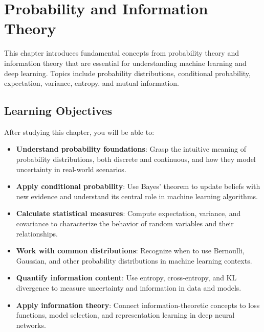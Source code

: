 
\chapter{Probability and Information Theory}
\label{chap:probability}

This chapter introduces fundamental concepts from probability theory and information theory that are essential for understanding machine learning and deep learning. Topics include probability distributions, conditional probability, expectation, variance, entropy, and mutual information.

\section*{Learning Objectives}

After studying this chapter, you will be able to:

\begin{itemize}
    \item \textbf{Understand probability foundations}: Grasp the intuitive meaning of probability distributions, both discrete and continuous, and how they model uncertainty in real-world scenarios.
    
    \item \textbf{Apply conditional probability}: Use Bayes' theorem to update beliefs with new evidence and understand its central role in machine learning algorithms.
    
    \item \textbf{Calculate statistical measures}: Compute expectation, variance, and covariance to characterize the behavior of random variables and their relationships.
    
    \item \textbf{Work with common distributions}: Recognize when to use Bernoulli, Gaussian, and other probability distributions in machine learning contexts.
    
    \item \textbf{Quantify information content}: Use entropy, cross-entropy, and KL divergence to measure uncertainty and information in data and models.
    
    \item \textbf{Apply information theory}: Connect information-theoretic concepts to loss functions, model selection, and representation learning in deep neural networks.
\end{itemize}









